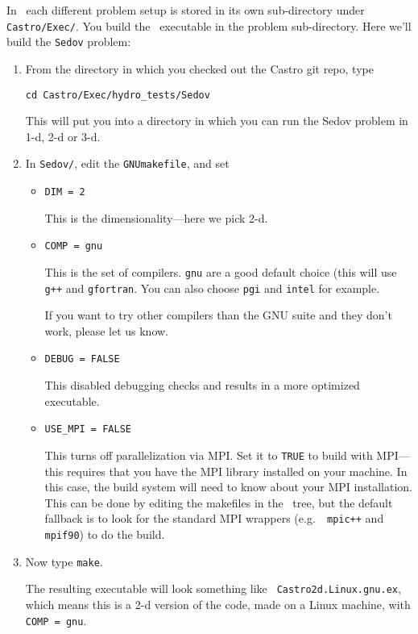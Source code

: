 In \castro\ each different problem setup is stored in its own
sub-directory under {\tt Castro/Exec/}.  You build the
\castro\ executable in the problem sub-directory.  Here we'll
build the {\tt Sedov} problem:

\begin{enumerate}

\item From the directory in which you checked out the Castro git repo,
  type
\begin{verbatim}
cd Castro/Exec/hydro_tests/Sedov
\end{verbatim}
This will put you into a directory in which you can run the Sedov
problem in 1-d, 2-d or 3-d.

\item In {\tt Sedov/}, edit the {\tt GNUmakefile}, and set
  \begin{itemize}
    \item {\tt DIM = 2} 

      This is the dimensionality---here we pick 2-d.

    \item {\tt COMP = gnu}

      This is the set of compilers.  {\tt gnu} are a good default
      choice (this will use {\tt g++} and {\tt gfortran}.  You can
      also choose {\tt pgi} and {\tt intel} for example.

      If you want to try other compilers than the GNU suite and they
      don't work, please let us know.

    \item {\tt DEBUG = FALSE}

      This disabled debugging checks and results in a more
      optimized executable.

    \item {\tt USE\_MPI = FALSE}

      This turns off parallelization via MPI.  Set it to {\tt TRUE} to
      build with MPI---this requires that you have the MPI library
      installed on your machine.  In this case, the build system will
      need to know about your MPI installation.  This can be done by
      editing the makefiles in the \amrex\ tree, but the default
      fallback is to look for the standard MPI wrappers (e.g.\ {\tt
        mpic++} and {\tt mpif90}) to do the build.

  \end{itemize}

\item Now type {\tt make}.

  The resulting executable will look something like {\tt
    Castro2d.Linux.gnu.ex}, which means this is a 2-d version
  of the code, made on a Linux machine, with {\tt COMP = gnu}.

\end{enumerate}

